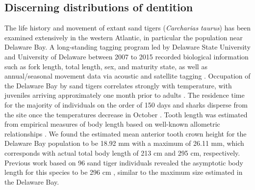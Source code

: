 \documentclass[]{rsos}%
\begin{document}
\subsection{Discerning distributions of dentition}

The life history and movement of extant sand tigers (\emph{Carcharias taurus}) has been examined extensively in the western Atlantic, in particular the population near Delaware Bay.
A long-standing tagging program led by Delaware State University and University of Delaware between 2007 to 2015 recorded biological information such as fork length, total length, sex, and maturity state, as well as annual/seasonal movement data via acoustic and satellite tagging  \cite{Teter2015, haulsee2018spatial, kilfoil2017targeted, haulsee2016implantation}.
Occupation of the Delaware Bay by sand tigers correlates strongly with temperature, with juveniles arriving approximately one month prior to adults \cite{haulsee2018spatial, Teter2015}.
The residence time for the majority of individuals on the order of 150 days and sharks disperse from the site once the temperatures decrease in October \cite{haulsee2018spatial, Teter2015}.
Tooth length was estimated from empirical measures of body length based on well-known allometric relationships \cite{Shimada2002, Shimada2004}. 
We found the estimated mean anterior tooth crown height for the Delaware Bay population to be 18.92 mm with a maximum of 26.11 mm, which corresponds with actual total body length of 213 cm and 295 cm, respectively. 
Previous work based on 96 sand tiger individuals revealed the asymptotic body length for this species to be 296 cm \cite{Goldman2006}, similar to the maximum size estimated in the Delaware Bay.
\end{document}
